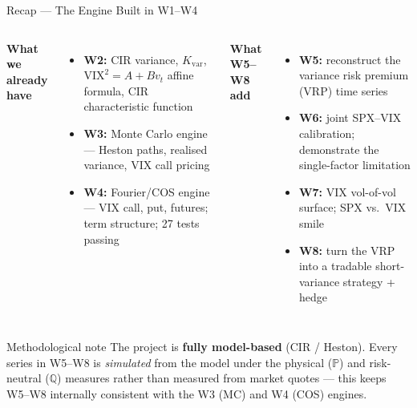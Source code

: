 \documentclass[aspectratio=169, 11pt]{beamer}
\begin{document}
\begin{frame}{Recap --- The Engine Built in W1--W4}

\begin{columns}[T]
\textbf{What we already have}
\begin{itemize}
  \item \textbf{W2:} CIR variance, $K_{\mathrm{var}}$, $\mathrm{VIX}^2 = A + Bv_t$ affine formula, CIR characteristic function
  \item \textbf{W3:} Monte Carlo engine --- Heston paths, realised variance, VIX call pricing
  \item \textbf{W4:} Fourier/COS engine --- VIX call, put, futures; term structure; 27 tests passing
\end{itemize}

\textbf{What W5--W8 add}
\begin{itemize}
  \item \textbf{W5:} reconstruct the variance risk premium (VRP) time series
  \item \textbf{W6:} joint SPX--VIX calibration; demonstrate the single-factor limitation
  \item \textbf{W7:} VIX vol-of-vol surface; SPX vs.\ VIX smile
  \item \textbf{W8:} turn the VRP into a tradable short-variance strategy + hedge
\end{itemize}
\end{columns}

\vspace{6pt}
\begin{block}{Methodological note}
\small
The project is \textbf{fully model-based} (CIR / Heston). Every series in W5--W8 is
\textit{simulated} from the model under the physical ($\mathbb{P}$) and risk-neutral
($\mathbb{Q}$) measures rather than measured from market quotes --- this keeps W5--W8
internally consistent with the W3 (MC) and W4 (COS) engines.
\end{block}
\end{frame}
\end{document}
